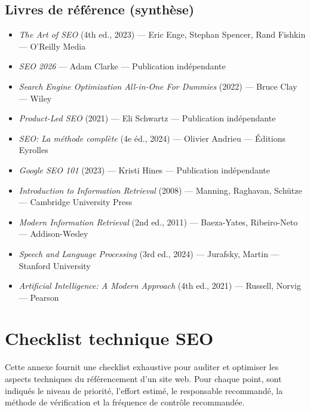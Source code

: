 \documentclass[12pt,a4paper,twoside]{report}
\begin{document}
\section*{Livres de référence (synthèse)}
\begin{itemize}
    \item \textit{The Art of SEO} (4th ed., 2023) — Eric Enge, Stephan Spencer, Rand Fishkin — O'Reilly Media
    \item \textit{SEO 2026} — Adam Clarke — Publication indépendante
    \item \textit{Search Engine Optimization All-in-One For Dummies} (2022) — Bruce Clay — Wiley
    \item \textit{Product-Led SEO} (2021) — Eli Schwartz — Publication indépendante
    \item \textit{SEO: La méthode complète} (4e éd., 2024) — Olivier Andrieu — Éditions Eyrolles
    \item \textit{Google SEO 101} (2023) — Kristi Hines — Publication indépendante
    \item \textit{Introduction to Information Retrieval} (2008) — Manning, Raghavan, Schütze — Cambridge University Press
    \item \textit{Modern Information Retrieval} (2nd ed., 2011) — Baeza-Yates, Ribeiro-Neto — Addison-Wesley
    \item \textit{Speech and Language Processing} (3rd ed., 2024) — Jurafsky, Martin — Stanford University
    \item \textit{Artificial Intelligence: A Modern Approach} (4th ed., 2021) — Russell, Norvig — Pearson
\end{itemize}

\newpage
\appendix
\chapter{Checklist technique SEO}
\label{app:checklist}

Cette annexe fournit une checklist exhaustive pour auditer et optimiser les aspects techniques du référencement d'un site web. Pour chaque point, sont indiqués le niveau de priorité, l'effort estimé, le responsable recommandé, la méthode de vérification et la fréquence de contrôle recommandée.
\end{document}
